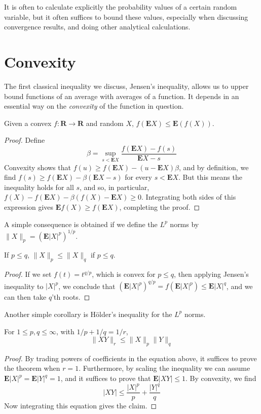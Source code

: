 It is often to calculate explicitly the probability values of a certain random variable, but it often suffices to bound these values, especially when discussing convergence results, and doing other analytical calculations.

\section{Convexity}

The first classical inequality we discuss, Jensen's inequality, allows us to upper bound functions of an average with averages of a function. It depends in an essential way on the {\it convexity} of the function in question.

\begin{theorem}
    Given a convex $f: \mathbf{R} \to \mathbf{R}$ and random $X$, $f(\mathbf{E} X) \leq \mathbf{E}(f(X))$.
\end{theorem}
\begin{proof}
    Define
    \[ \beta = \sup_{s < \mathbf{E}X} \frac{f(\mathbf{E}X) - f(s)}{\mathbf{E} X - s} \]
    Convexity shows that $f(u) \geq f(\mathbf{E}X) - (u-\mathbf{E}X) \beta$, and by definition, we find $f(s) \geq f(\mathbf{E}X) - \beta (\mathbf{E} X - s)$ for every $s < \mathbf{E}X$. But this means the inequality holds for all $s$, and so, in particular, $f(X) - f(\mathbf{E} X) - \beta(f(X) - \mathbf{E}X) \geq 0$. Integrating both sides of this expression gives $\mathbf{E} f(X) \geq f(\mathbf{E} X)$, completing the proof.
\end{proof}

A simple consequence is obtained if we define the $L^p$ norms by $\| X \|_p = (\mathbf{E} |X|^p)^{1/p}$.

\begin{corollary}
    If $p \leq q$, $\| X \|_p \leq \| X \|_q$ if $p \leq q$.
\end{corollary}
\begin{proof}
    If we set $f(t) = t^{q/p}$, which is convex for $p \leq q$, then applying Jensen's inequality to $|X|^p$, we conclude that $(\mathbf{E} |X|^p)^{q/p} = f(\mathbf{E} |X|^p) \leq \mathbf{E} |X|^q$, and we can then take $q$'th roots.
\end{proof}

Another simple corollary is H\"{o}lder's inequality for the $L^p$ norms.

\begin{corollary}
    For $1 \leq p,q \leq \infty$, with $1/p + 1/q = 1/r$,
    \[ \| X Y \|_r \leq \| X \|_p \| Y \|_q \]
\end{corollary}
\begin{proof}
    By trading powers of coefficients in the equation above, it suffices to prove the theorem when $r = 1$. Furthermore, by scaling the inequality we can assume $\mathbf{E}|X|^p = \mathbf{E}|Y|^q = 1$, and it suffices to prove that $\mathbf{E}|XY| \leq 1$. By convexity, we find
    \[ |XY| \leq \frac{|X|^p}{p} + \frac{|Y|^q}{q} \]
    Now integrating this equation gives the claim.
\end{proof}

